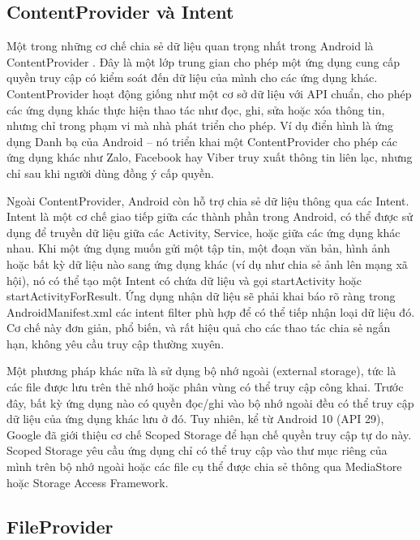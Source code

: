 \subsection{ContentProvider và Intent}    
        Một trong những cơ chế chia sẻ dữ liệu quan trọng nhất trong Android là ContentProvider \cite{Content-Providers}. Đây là một lớp trung gian cho phép một ứng dụng cung cấp quyền truy cập có kiểm soát đến dữ liệu của mình cho các ứng dụng khác. ContentProvider hoạt động giống như một cơ sở dữ liệu với API chuẩn, cho phép các ứng dụng khác thực hiện thao tác như đọc, ghi, sửa hoặc xóa thông tin, nhưng chỉ trong phạm vi mà nhà phát triển cho phép. Ví dụ điển hình là ứng dụng Danh bạ của Android – nó triển khai một ContentProvider cho phép các ứng dụng khác như Zalo, Facebook hay Viber truy xuất thông tin liên lạc, nhưng chỉ sau khi người dùng đồng ý cấp quyền.

        \vspace{0.5em}

        Ngoài ContentProvider, Android còn hỗ trợ chia sẻ dữ liệu thông qua các Intent. Intent là một cơ chế giao tiếp giữa các thành phần trong Android, có thể được sử dụng để truyền dữ liệu giữa các Activity, Service, hoặc giữa các ứng dụng khác nhau. Khi một ứng dụng muốn gửi một tập tin, một đoạn văn bản, hình ảnh hoặc bất kỳ dữ liệu nào sang ứng dụng khác (ví dụ như chia sẻ ảnh lên mạng xã hội), nó có thể tạo một Intent có chứa dữ liệu và gọi startActivity hoặc startActivityForResult. Ứng dụng nhận dữ liệu sẽ phải khai báo rõ ràng trong AndroidManifest.xml các intent filter phù hợp để có thể tiếp nhận loại dữ liệu đó. Cơ chế này đơn giản, phổ biến, và rất hiệu quả cho các thao tác chia sẻ ngắn hạn, không yêu cầu truy cập thường xuyên.

        \vspace{0.5em}

        Một phương pháp khác nữa là sử dụng bộ nhớ ngoài (external storage), tức là các file được lưu trên thẻ nhớ hoặc phân vùng có thể truy cập công khai. Trước đây, bất kỳ ứng dụng nào có quyền đọc/ghi vào bộ nhớ ngoài đều có thể truy cập dữ liệu của ứng dụng khác lưu ở đó. Tuy nhiên, kể từ Android 10 (API 29), Google đã giới thiệu cơ chế Scoped Storage để hạn chế quyền truy cập tự do này. Scoped Storage yêu cầu ứng dụng chỉ có thể truy cập vào thư mục riêng của mình trên bộ nhớ ngoài hoặc các file cụ thể được chia sẻ thông qua MediaStore hoặc Storage Access Framework.

\subsection{FileProvider}
\renewcommand{\labelitemi}{--}   

